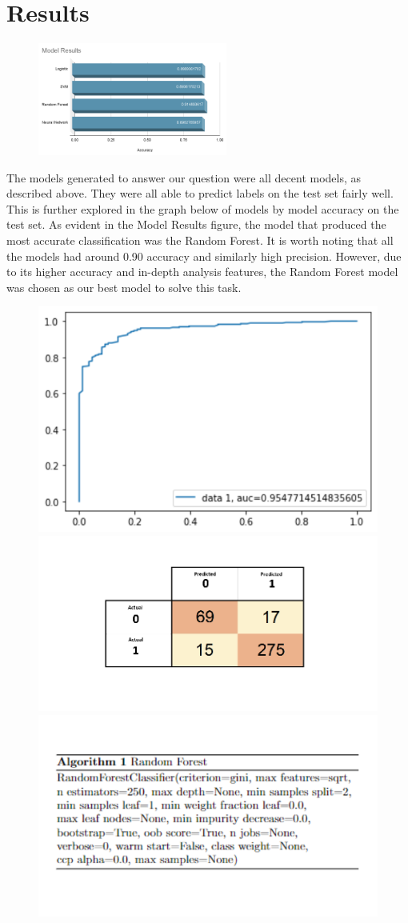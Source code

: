 \documentclass{article}
\begin{document}
\section{Results}
\begin{figure}
  \centering
  \includegraphics[height=3.7cm]{model_results.png}
\end{figure}
The models generated to answer our question were all decent models, as described above. They were all able to predict labels on the test set fairly well. This is further explored in the graph below of models by model accuracy on the test set. 
As evident in the Model Results figure, the model that produced the most accurate classification was the Random Forest. It is worth noting that all the models had around 0.90 accuracy and similarly high precision. However, due to its higher accuracy and in-depth analysis features, the Random Forest model was chosen as our best model to solve this task.
\begin{figure}[htp]
\centering
\includegraphics[width=.3\textwidth]{rf_auc_curve.png}\hfill
\includegraphics[width=.3\textwidth]{rf_conf_matrix.png}\hfill
\includegraphics[width=.4\textwidth]{rf_algorithm.png}
\end{figure}
\end{document}
